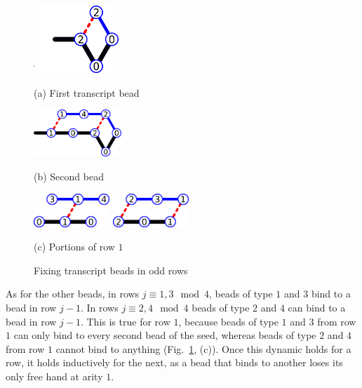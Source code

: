 \begin{figure}
	\begin{minipage}{.35\textwidth}
		\centering
		\includegraphics[align=c,height=1in]{./Fig/CI_1n}\\
		\bigskip
		
		(a) First transcript bead
	\end{minipage}%
	\begin{minipage}{.2\textwidth}
		\centering
		\includegraphics[align=c,height=0.7in]{./Fig/CI_2n}\\
		\bigskip
		
		(b) Second bead
	\end{minipage}
	\begin{minipage}{.4\textwidth}
		\centering
		\includegraphics[align=c,height=0.5in]{./Fig/CI_3n}
		\bigskip
		\vspace{0.1in}
		\includegraphics[align=c,height=0.5in]{./Fig/CI_4n}
		\bigskip
		
		(c) Portions of row $1$
	\end{minipage}
	\caption{Fixing transcript beads in odd rows}
	\label{CI:1-4}
\end{figure}


As for the other beads, in rows $j\equiv 1,3\mod 4$, beads of type $1$ and $3$ bind to a bead in row $j-1$. In rows $j\equiv 2,4\mod 4$ beads of type $2$ and $4$ can bind to a bead in row $j-1$.  This is true for row $1$, because beads of type $1$ and $3$ from row $1$ can only bind to every second bead of the seed, whereas beads of type $2$ and $4$ from row $1$ cannot bind to anything (Fig.~\ref{CI:1-4}, (c)). Once this dynamic holds for a row, it holds inductively for the next, as a bead that binds to another loses its only free hand at arity $1$.


